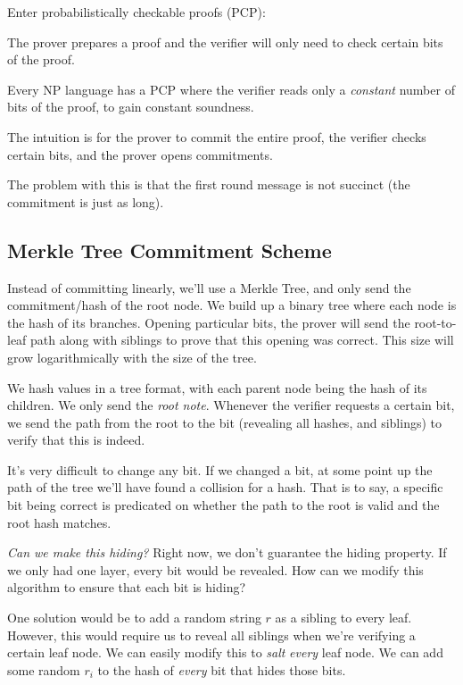 Enter probabilistically checkable proofs (PCP):

The prover prepares a proof and the verifier will only need to check certain bits of the proof.

\begin{theorem}
    Every \textsf{NP} language has a PCP where the verifier reads only a \emph{constant} number of bits of the proof, to gain constant soundness.
\end{theorem}

The intuition is for the prover to commit the entire proof, the verifier checks certain bits, and the prover opens commitments.


The problem with this is that the first round message is not succinct (the commitment is just as long).

\subsection{Merkle Tree Commitment Scheme}
Instead of committing linearly, we'll use a Merkle Tree, and only send the commitment/hash of the root node. We build up a binary tree where each node is the hash of its branches. Opening particular bits, the prover will send the root-to-leaf path along with siblings to prove that this opening was correct. This size will grow logarithmically with the size of the tree.


We hash values in a tree format, with each parent node being the hash of its children. We only send the \emph{root note}. Whenever the verifier requests a certain bit, we send the path from the root to the bit (revealing all hashes, and siblings) to verify that this is indeed.

It's very difficult to change any bit. If we changed a bit, at some point up the path of the tree we'll have found a collision for a hash. That is to say, a specific bit being correct is predicated on whether the path to the root is valid and the root hash matches.

\emph{Can we make this hiding?} Right now, we don't guarantee the hiding property. If we only had one layer, every bit would be revealed. How can we modify this algorithm to ensure that each bit is hiding?

One solution would be to add a random string $r$ as a sibling to every leaf. However, this would require us to reveal all siblings when we're verifying a certain leaf node. We can easily modify this to \emph{salt} \emph{every} leaf node. We can add some random $r_i$ to the hash of \emph{every} bit that hides those bits.

